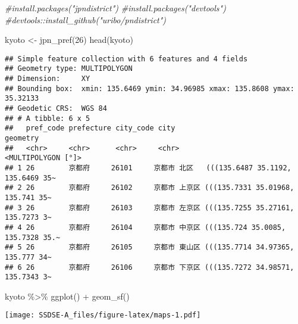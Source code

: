 \documentclass[
]{article}
\newenvironment{Shaded}{\begin{snugshade}}{\end{snugshade}}
\newcommand{\CommentTok}[1]{\textcolor[rgb]{0.56,0.35,0.01}{\textit{#1}}}
\newcommand{\DecValTok}[1]{\textcolor[rgb]{0.00,0.00,0.81}{#1}}
\newcommand{\FunctionTok}[1]{\textcolor[rgb]{0.00,0.00,0.00}{#1}}
\newcommand{\NormalTok}[1]{#1}
\newcommand{\OtherTok}[1]{\textcolor[rgb]{0.56,0.35,0.01}{#1}}
\newcommand{\SpecialCharTok}[1]{\textcolor[rgb]{0.00,0.00,0.00}{#1}}
\begin{document}
\begin{Shaded}
\begin{Highlighting}[]
\CommentTok{\#install.packages("jpndistrict")}
\CommentTok{\#install.packages("devtools")}
\CommentTok{\#devtools::install\_github("uribo/pndistrict")}

\NormalTok{kyoto }\OtherTok{\textless{}{-}} \FunctionTok{jpn\_pref}\NormalTok{(}\DecValTok{26}\NormalTok{)}
\FunctionTok{head}\NormalTok{(kyoto)}
\end{Highlighting}
\end{Shaded}

\begin{verbatim}
## Simple feature collection with 6 features and 4 fields
## Geometry type: MULTIPOLYGON
## Dimension:     XY
## Bounding box:  xmin: 135.6469 ymin: 34.96985 xmax: 135.8608 ymax: 35.32133
## Geodetic CRS:  WGS 84
## # A tibble: 6 x 5
##   pref_code prefecture city_code city                                   geometry
##   <chr>     <chr>      <chr>     <chr>                        <MULTIPOLYGON [°]>
## 1 26        京都府     26101     京都市 北区   (((135.6487 35.1192, 135.6469 35~
## 2 26        京都府     26102     京都市 上京区 (((135.7331 35.01968, 135.741 35~
## 3 26        京都府     26103     京都市 左京区 (((135.7255 35.27161, 135.7273 3~
## 4 26        京都府     26104     京都市 中京区 (((135.724 35.0085, 135.7328 35.~
## 5 26        京都府     26105     京都市 東山区 (((135.7714 34.97365, 135.777 34~
## 6 26        京都府     26106     京都市 下京区 (((135.7272 34.98571, 135.7343 3~
\end{verbatim}

\begin{Shaded}
\begin{Highlighting}[]
\NormalTok{kyoto }\SpecialCharTok{\%\textgreater{}\%} 
  \FunctionTok{ggplot}\NormalTok{() }\SpecialCharTok{+} 
  \FunctionTok{geom\_sf}\NormalTok{()}
\end{Highlighting}
\end{Shaded}

\texttt{[image: SSDSE-A\_files/figure-latex/maps-1.pdf]}
\end{document}
